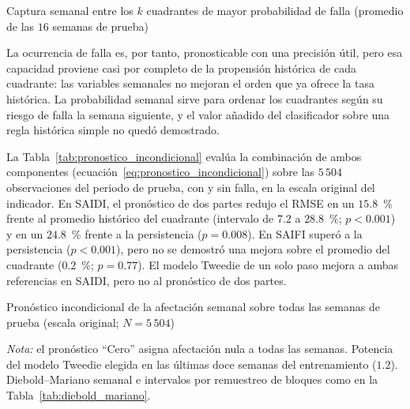\begin{table}[!htbp]
\centering
\small
\caption{Captura semanal entre los $k$ cuadrantes de mayor probabilidad de falla (promedio de las $16$ semanas de prueba)}
\label{tab:topk}
\begin{adjustbox}{max width=\linewidth}

\end{adjustbox}
\end{table}

La ocurrencia de falla es, por tanto, pronosticable con una precisión útil, pero esa capacidad proviene casi por completo de la propensión histórica de cada cuadrante: las variables semanales no mejoran el orden que ya ofrece la tasa histórica. La probabilidad semanal sirve para ordenar los cuadrantes según su riesgo de falla la semana siguiente, y el valor añadido del clasificador sobre una regla histórica simple no quedó demostrado.

La Tabla~\ref{tab:pronostico_incondicional} evalúa la combinación de ambos componentes (ecuación~\eqref{eq:pronostico_incondicional}) sobre las $5\,504$ observaciones del periodo de prueba, con y sin falla, en la escala original del indicador. En SAIDI, el pronóstico de dos partes redujo el RMSE en un $15{.}8$~\% frente al promedio histórico del cuadrante (intervalo de $7{.}2$ a $28{.}8$~\%; $p<0{.}001$) y en un $24{.}8$~\% frente a la persistencia ($p=0{.}008$). En SAIFI superó a la persistencia ($p<0{.}001$), pero no se demostró una mejora sobre el promedio del cuadrante ($0{.}2$~\%; $p=0{.}77$). El modelo Tweedie de un solo paso mejora a ambas referencias en SAIDI, pero no al pronóstico de dos partes.

\begin{table}[!htbp]
\centering
\small
\caption{Pronóstico incondicional de la afectación semanal sobre todas las semanas de prueba (escala original; $N=5\,504$)}
\label{tab:pronostico_incondicional}
\begin{adjustbox}{max width=\linewidth}

\end{adjustbox}

\vspace{4pt}
\begin{adjustbox}{max width=\linewidth}

\end{adjustbox}

\vspace{2pt}
\noindent\footnotesize\textit{Nota:} el pronóstico ``Cero'' asigna afectación nula a todas las semanas. Potencia del modelo Tweedie elegida en las últimas doce semanas del entrenamiento ($1{.}2$). Diebold--Mariano semanal e intervalos por remuestreo de bloques como en la Tabla~\ref{tab:diebold_mariano}.
\end{table}

